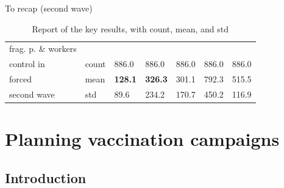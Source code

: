 \documentclass[8pt]{beamer}
\begin{document}
\begin{frame}{To recap (second wave)}
\begin{table}[H]
\begin{tabular}{p{1.8cm}p{0.5cm}p{0.5cm}p{0.5cm}p{0.5cm}p{0.5cm}p{0.5cm}}
\midrule
frag. p. \& workers \\  
control in              & count &   886.0 &                      886.0 &              886.0 &                   886.0 &  886.0 \\
forced                  & mean  &  \textbf{{\color{cyan}128.1}} &         \textbf{{\color{cyan}326.3}} &          301.1 &        792.3 &  515.5 \\
second wave       & std   &  89.6 &        234.2 &   170.7 &          450.2 &  116.9 \\


\bottomrule
\end{tabular}
\caption{Report of the key results, with count, mean, and std}
\label{keyResultsT}
\end{table}



\end{frame}

\section{Planning vaccination campaigns}

\subsection{Introduction}
\end{document}
